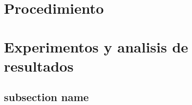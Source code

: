 \newpage
\section{Procedimiento}
\newpage
\section{Experimentos y analisis de resultados}
\subsection{subsection name}

